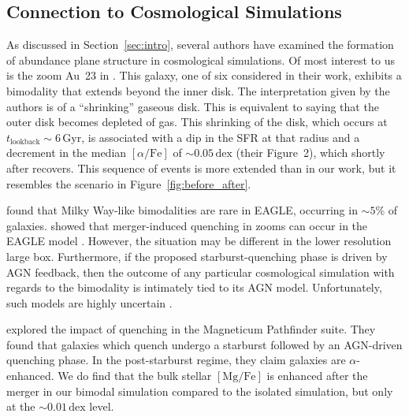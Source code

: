 \documentclass[twocolumn,linenumbers,trackchanges]{aastex631}
\newcommand{\Gyr}{\ensuremath{\textrm{Gyr}}}
\newcommand{\MgFe}{\ensuremath{[\textrm{Mg}/\textrm{Fe}]}}
\newcommand{\alphaFe}{\ensuremath{[\alpha/\textrm{Fe}]}}
\newcommand{\dex}{\ensuremath{\textrm{dex}}}
\begin{document}

\subsection{Connection to Cosmological Simulations}\label{ssec:cosmo}
As discussed in Section~\ref{sec:intro}, several authors have examined the formation of abundance plane structure in cosmological simulations. Of most interest to us is the zoom Au~23 in \citet{2018MNRAS.474.3629G}. This galaxy, one of six considered in their work, exhibits a bimodality that extends beyond the inner disk. The interpretation given by the authors is of a ``shrinking'' gaseous disk. This is equivalent to saying that the outer disk becomes depleted of gas. This shrinking of the disk, which occurs at $t_{\textrm{lookback}}\sim6\,\Gyr$, is associated with a dip in the SFR at that radius and a decrement in the median \alphaFe{} of $\sim0.05\,\dex$ (their Figure~2), which shortly after recovers. This sequence of events is more extended than in our work, but it resembles the scenario in Figure~\ref{fig:before_after}.

\citet{2018MNRAS.477.5072M} found that Milky Way-like bimodalities are rare in EAGLE, occurring in $\sim5\%$ of galaxies. \citet{2021MNRAS.501..236D,2022MNRAS.515.1430D} showed that merger-induced quenching in zooms can occur in the EAGLE model \citep[see also][]{2017MNRAS.465..547P}. However, the situation may be different in the lower resolution large box. Furthermore, if the proposed starburst-quenching phase is driven by AGN feedback, then the outcome of any particular cosmological simulation with regards to the bimodality is intimately tied to its AGN model. Unfortunately, such models are highly uncertain \citep[e.g.][]{2022MNRAS.511.3751H}.

\citet{2023arXiv231016085K} explored the impact of quenching in the Magneticum Pathfinder suite. They found that galaxies which quench undergo a starburst followed by an AGN-driven quenching phase. In the post-starburst regime, they claim galaxies are $\alpha$-enhanced. We do find that the bulk stellar \MgFe{} is enhanced after the merger in our bimodal simulation compared to the isolated simulation, but only at the $\sim0.01\,\dex$ level.
\end{document}
